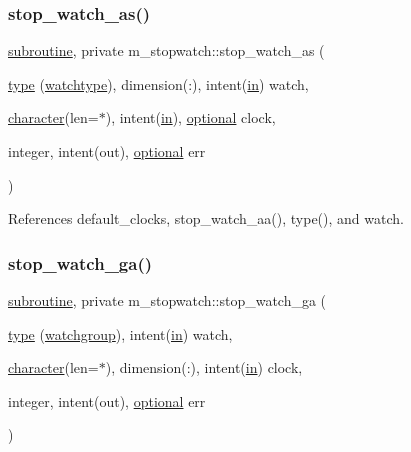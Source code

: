 \subsubsection{\texorpdfstring{stop\+\_\+watch\+\_\+as()}{stop\_watch\_as()}}
{\footnotesize\ttfamily \hyperlink{M__stopwatch_83_8txt_acfbcff50169d691ff02d4a123ed70482}{subroutine}, private m\+\_\+stopwatch\+::stop\+\_\+watch\+\_\+as (\begin{DoxyParamCaption}\item[{\hyperlink{stop__watch_83_8txt_a70f0ead91c32e25323c03265aa302c1c}{type} (\hyperlink{structm__stopwatch_1_1watchtype}{watchtype}), dimension(\+:), intent(\hyperlink{M__journal_83_8txt_afce72651d1eed785a2132bee863b2f38}{in})}]{watch,  }\item[{\hyperlink{option__stopwatch_83_8txt_abd4b21fbbd175834027b5224bfe97e66}{character}(len=$\ast$), intent(\hyperlink{M__journal_83_8txt_afce72651d1eed785a2132bee863b2f38}{in}), \hyperlink{option__stopwatch_83_8txt_aa4ece75e7acf58a4843f70fe18c3ade5}{optional}}]{clock,  }\item[{integer, intent(out), \hyperlink{option__stopwatch_83_8txt_aa4ece75e7acf58a4843f70fe18c3ade5}{optional}}]{err }\end{DoxyParamCaption})\hspace{0.3cm}{\ttfamily [private]}}



References default\+\_\+clocks, stop\+\_\+watch\+\_\+aa(), type(), and watch.

\mbox{\label{namespacem__stopwatch_a4e078bf14eb68674747cdb6970444f96}} 
\subsubsection{\texorpdfstring{stop\+\_\+watch\+\_\+ga()}{stop\_watch\_ga()}}
{\footnotesize\ttfamily \hyperlink{M__stopwatch_83_8txt_acfbcff50169d691ff02d4a123ed70482}{subroutine}, private m\+\_\+stopwatch\+::stop\+\_\+watch\+\_\+ga (\begin{DoxyParamCaption}\item[{\hyperlink{stop__watch_83_8txt_a70f0ead91c32e25323c03265aa302c1c}{type} (\hyperlink{structm__stopwatch_1_1watchgroup}{watchgroup}), intent(\hyperlink{M__journal_83_8txt_afce72651d1eed785a2132bee863b2f38}{in})}]{watch,  }\item[{\hyperlink{option__stopwatch_83_8txt_abd4b21fbbd175834027b5224bfe97e66}{character}(len=$\ast$), dimension(\+:), intent(\hyperlink{M__journal_83_8txt_afce72651d1eed785a2132bee863b2f38}{in})}]{clock,  }\item[{integer, intent(out), \hyperlink{option__stopwatch_83_8txt_aa4ece75e7acf58a4843f70fe18c3ade5}{optional}}]{err }\end{DoxyParamCaption})\hspace{0.3cm}{\ttfamily [private]}}



